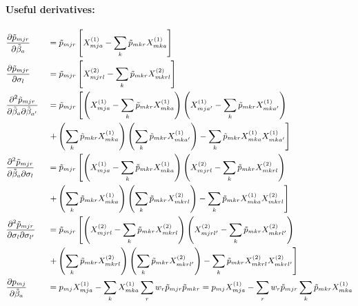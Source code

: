 \documentclass[12pt]{article}
\begin{document}
\paragraph{Useful derivatives: \\}
\begin{equation}
\small
\begin{aligned}
	& \frac{\partial \tilde{p}_{mjr}}{\partial \tilde{\beta}_a} && =  \tilde{p}_{mjr} \left[ X_{mja}^{(1)} - \sum_k \tilde{p}_{mkr} X_{mka}^{(1)}  \right] \\
	& \frac{\partial \tilde{p}_{mjr}}{\partial \sigma_l} && =  \tilde{p}_{mjr} \left[ X_{mjrl}^{(2)} - \sum_k \tilde{p}_{mkr} X_{mkrl}^{(2)}  \right] \\
	& \frac{\partial^2 \tilde{p}_{mjr}}{\partial \tilde{\beta}_a \partial \tilde{\beta}_{a'}} && = \tilde{p}_{mjr} \left[ \left( X_{mja}^{(1)} - \sum_{k} \tilde{p}_{mkr} X^{(1)}_{mka} \right) \left( X_{mja'}^{(1)} - \sum_{k} \tilde{p}_{mkr} X^{(1)}_{mka'} \right) \right.  \\
	& && \left. + \left( \sum_k \tilde{p}_{mkr} X^{(1)}_{mka} \right) \left( \sum_k \tilde{p}_{mkr} X^{(1)}_{mka'} \right) - \sum_k \tilde{p}_{mkr} X_{mka}^{(1)} X_{mka'}^{(1)} \right] \\
	& \frac{\partial^2 \tilde{p}_{mjr}}{\partial \tilde{\beta}_a \partial \sigma_l} && = \tilde{p}_{mjr} \left[ \left( X_{mja}^{(1)} - \sum_{k} \tilde{p}_{mkr} X^{(1)}_{mka} \right) \left( X_{mjrl}^{(2)} - \sum_{k} \tilde{p}_{mkr} X^{(2)}_{mkrl} \right) \right.  \\
	& && \left. + \left( \sum_k \tilde{p}_{mkr} X^{(1)}_{mka} \right) \left( \sum_k \tilde{p}_{mkr} X^{(2)}_{mkrl} \right) - \sum_k \tilde{p}_{mkr} X_{mka}^{(1)} X_{mkrl}^{(2)} \right] \\
	& \frac{\partial^2 \tilde{p}_{mjr}}{\partial \sigma_l \partial \sigma_{l'}} && = \tilde{p}_{mjr} \left[ \left( X_{mjrl}^{(2)} - \sum_{k} \tilde{p}_{mkr} X^{(2)}_{mkrl} \right) \left( X_{mjrl'}^{(2)} - \sum_{k} \tilde{p}_{mkr} X^{(2)}_{mkrl'} \right) \right.  \\
	& && \left. + \left( \sum_k \tilde{p}_{mkr} X^{(2)}_{mkrl} \right) \left( \sum_k \tilde{p}_{mkr} X^{(2)}_{mkrl'} \right) - \sum_k \tilde{p}_{mkr} X_{mkrl}^{(2)} X_{mkrl'}^{(2)} \right] \\
	& \frac{\partial p_{mj}}{\partial \tilde{\beta}_a} && =  p_{mj} X_{mja}^{(1)} - \sum_k X_{mka}^{(1)} \sum_r w_r \tilde{p}_{mjr} \tilde{p}_{mkr}  =  p_{mj} X_{mja}^{(1)} - \sum_r w_r \tilde{p}_{mjr} \sum_k \tilde{p}_{mkr} X_{mka}^{(1)} \\

\end{aligned}
\end{equation}
\end{document}
